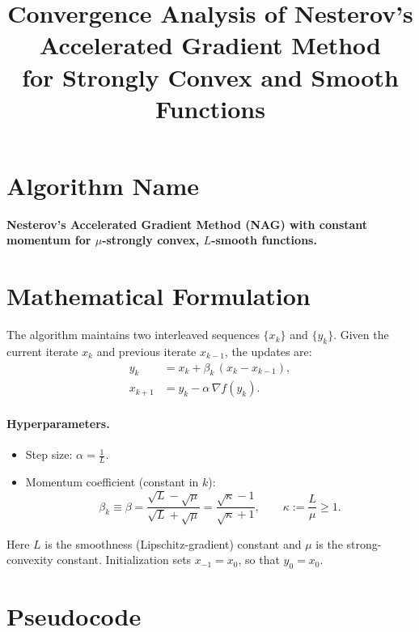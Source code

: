 \documentclass[11pt]{article}
\title{Convergence Analysis of Nesterov's Accelerated Gradient Method\\ for Strongly Convex and Smooth Functions}
\author{}
\date{}
\begin{document}
\maketitle

\section*{Algorithm Name}
\textbf{Nesterov's Accelerated Gradient Method (NAG) with constant momentum for $\mu$-strongly convex, $L$-smooth functions.}

\section*{Mathematical Formulation}

The algorithm maintains two interleaved sequences $\{x_k\}$ and $\{y_k\}$. Given the current iterate $x_k$ and previous iterate $x_{k-1}$, the updates are:
\begin{align}
y_k &= x_k + \beta_k\,(x_k - x_{k-1}), \label{eq:extrap}\\
x_{k+1} &= y_k - \alpha\,\nabla f(y_k). \label{eq:grad}
\end{align}

\paragraph{Hyperparameters.}
\begin{itemize}
\item Step size: $\displaystyle \alpha = \frac{1}{L}$.
\item Momentum coefficient (constant in $k$):
\[
\beta_k \equiv \beta = \frac{\sqrt{L}-\sqrt{\mu}}{\sqrt{L}+\sqrt{\mu}}
= \frac{\sqrt{\kappa}-1}{\sqrt{\kappa}+1},
\qquad \kappa := \frac{L}{\mu}\ge 1 .
\]
\end{itemize}
Here $L$ is the smoothness (Lipschitz-gradient) constant and $\mu$ is the strong-convexity constant. Initialization sets $x_{-1}=x_0$, so that $y_0=x_0$.

\section*{Pseudocode}
\end{document}

